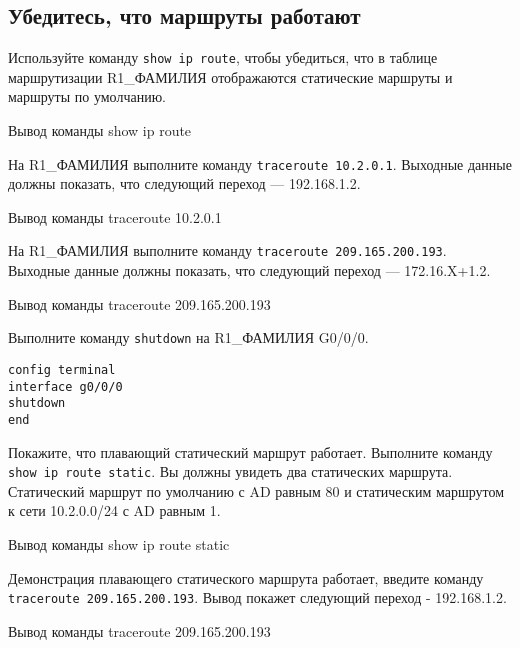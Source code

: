 \subsection{Убедитесь, что маршруты работают}

Используйте команду \texttt{show ip route}, чтобы убедиться,
что в таблице маршрутизации R1\_ФАМИЛИЯ отображаются статические маршруты
и маршруты по умолчанию.

\begin{image}
	\caption{Вывод команды show ip route}
\end{image}

На R1\_ФАМИЛИЯ выполните команду \texttt{traceroute 10.2.0.1}.
Выходные данные должны показать, что следующий переход — 192.168.1.2.

\begin{image}
	\caption{Вывод команды traceroute 10.2.0.1}
\end{image}

На R1\_ФАМИЛИЯ выполните команду \texttt{traceroute 209.165.200.193}.
Выходные данные должны показать, что следующий переход — 172.16.X+1.2.

\begin{image}
	\caption{Вывод команды traceroute 209.165.200.193}
\end{image}

Выполните команду \texttt{shutdown} на R1\_ФАМИЛИЯ G0/0/0.

\begin{verbatim}
config terminal
interface g0/0/0
shutdown
end
\end{verbatim}

Покажите, что плавающий статический маршрут работает.
Выполните команду \texttt{show ip route static}.
Вы должны увидеть два статических маршрута.
Статический маршрут по умолчанию с AD
равным 80 и статическим маршрутом к сети 10.2.0.0/24 с AD равным 1.

\begin{image}
	\caption{Вывод команды show ip route static}
\end{image}

Демонстрация плавающего статического маршрута работает,
введите команду \texttt{traceroute 209.165.200.193}.
Вывод покажет следующий переход - 192.168.1.2.

\begin{image}
	\caption{Вывод команды traceroute 209.165.200.193}
\end{image}

